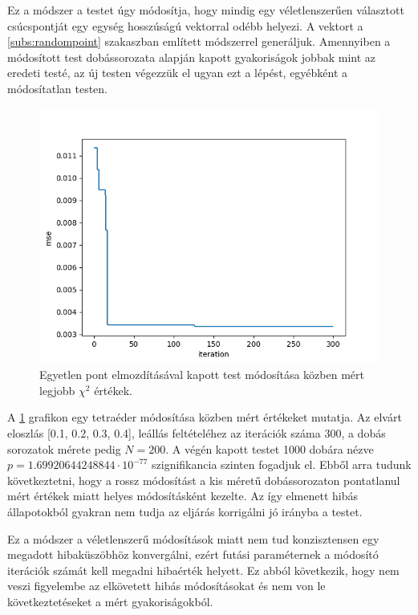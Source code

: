 \label{sect:randmodification}

Ez a módszer a testet úgy módosítja, hogy mindig egy véletlenszerűen választott csúcspontját egy egység hosszúságú vektorral odébb helyezi.
A vektort a \ref{subs:randompoint} szakaszban említett módszerrel generáljuk.
Amennyiben a módosított test dobássorozata alapján kapott gyakoriságok jobbak mint az eredeti testé, az új testen végezzük el ugyan ezt a lépést, egyébként a módosítatlan testen.
\begin{figure}[h!]
	\centering
	\includegraphics[scale=0.7]{images/randmodify_mse.png}
	\caption{Egyetlen pont elmozdításával kapott test módosítása közben mért legjobb $\chi^2$ értékek.}
	\label{fig:randmodify_chi2}
\end{figure}
A \ref{fig:randmodify_chi2} grafikon egy tetraéder módosítása közben mért értékeket mutatja.
Az elvárt eloszlás [0.1, 0.2, 0.3, 0.4], leállás feltételéhez az iterációk száma $300$, a dobás sorozatok mérete pedig $N=200$.
A végén kapott testet 1000 dobára nézve $p=1.69920644248844\cdot10^{-77}$ szignifikancia szinten fogadjuk el.
Ebből arra tudunk következtetni, hogy a rossz módosítást a kis méretű dobássorozaton pontatlanul mért értékek miatt helyes módosításként kezelte.
Az így elmenett hibás állapotokból gyakran nem tudja az eljárás korrigálni jó irányba a testet.

Ez a módszer a véletlenszerű módosítások miatt nem tud konzisztensen egy megadott hibaküszöbhöz konvergálni, ezért futási paraméternek a módosító iterációk számát kell megadni hibaérték helyett.
Ez abból következik, hogy nem veszi figyelembe az elkövetett hibás módosításokat és nem von le következtetéseket a mért gyakoriságokból.

